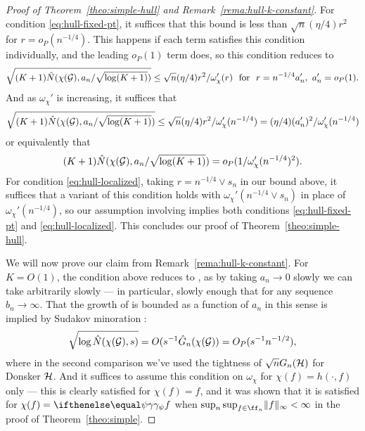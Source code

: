 \begin{proof}[Proof of Theorem~\ref{theo:simple-hull} and Remark~\ref{rema:hull-k-constant}]
For condition \eqref{eq:hull-fixed-pt}, it suffices
that this bound is less than $\sqrt{n}(\eta/4) r^2$ for $r=o_P(n^{-1/4})$. This happens if each term satisfies this condition individually,
and the leading $o_P(1)$ term does, so this condition reduces to
\[ \sqrt{(K+1)\hat N(\chi(\GG), a_n/\sqrt{\log(K+1)})} \le \sqrt{n}(\eta/4) r^2 /\omega_{\chi}'(r)\ \text{ for }\ r=n^{-1/4}a_n',\ a_n' = o_P(1). \]
And as $\omega_{\chi}'$ is increasing, it suffices that
\[ \sqrt{(K+1)\hat N(\chi(\mathcal{G}), a_n/\sqrt{\log(K+1)})} \le \sqrt{n}(\eta/4) r^2 / \omega_{\chi}'(n^{-1/4}) 
							= (\eta/4)(a_n')^2 / \omega_{\chi}'(n^{-1/4}) \]
or equivalently that
\[ (K+1)\hat N(\chi(\mathcal{G}), a_n/\sqrt{\log(K+1)}) = o_P(1/\omega_{\chi}'(n^{-1/4})^2). \]
For condition \eqref{eq:hull-localized}, taking $r=n^{-1/4} \vee s_n$  in our bound above,
it suffices that a variant of this condition holds with $\omega_{\chi}'(n^{-1/4} \vee s_n)$ 
in place of $\omega_{\chi}'(n^{-1/4})$, so our assumption involving  implies both 
conditions \eqref{eq:hull-fixed-pt} and \eqref{eq:hull-localized}. 
This concludes our proof of Theorem~\ref{theo:simple-hull}.
 

We will now prove our claim from Remark~\ref{rema:hull-k-constant}. For $K=O(1)$, 
the condition above reduces to , as by taking $a_n \to 0$ slowly we can take  arbitrarily slowly ---
in particular, slowly enough that  for any sequence $b_n \to \infty$.
That the growth of  is bounded as a function of $a_n$ 
in this sense is implied by Sudakov minoration \citep[e.g.,][Theorem 3.18]{ledoux1991probability}:
\[ \sqrt{\log \hat N(\chi(\mathcal{G}), s)} = O(s^{-1}\hat G_n(\chi(\mathcal{G})) = O_P(s^{-1}n^{-1/2}), \]
where in the second comparison we've used the tightness of $\sqrt{n}G_n(\mathcal{H})$ for Donsker $\mathcal{H}$.
And it suffices to assume this condition
on $\omega_{\chi}$ for $\chi(f)=h(\cdot,f)$ only ---
this is clearly satisfied for $\chi(f)=f$, and it was shown that it is satisfied for $\chi(f)=\riesz[\psi]f$
when $\sup_n\sup_{f \in \ff_n}\norm{f}_{\infty} < \infty$ in the proof of Theorem~\ref{theo:simple}.
\end{proof}

